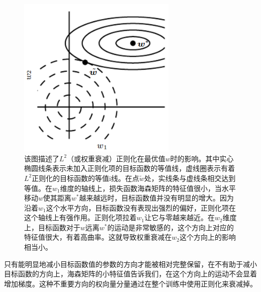 \begin{figure}[htbp] %
   \centering
   \includegraphics[width=3in]{fig/chap7/7_1.png} 
   \caption{该图描述了$L^2$（或权重衰减）正则化在最优值$w$时的影响。其中实心椭圆线条表示未加入正则化项的目标函数的等值线，虚线圈表示有着$L^2$正则化的目标函数的等值i线。在点$\widetilde{w}$处，实线条与虚线条相交达到等值。在$w_1$维度的轴线上，损失函数海森矩阵的特征值很小，当水平移动$w$使其距离$w^*$越来越远时，目标函数值并没有明显的增大。因为沿着$w_1$这个水平方向，目标函数没有表现出强烈的偏好，正则化项在这个轴线上有强作用。正则化项拉着$w_1$让它与零越来越近。在$w_2$维度上，目标函数对于$w$远离$w^*$的运动是非常敏感的，这个方向上对应的特征值很大，有着高曲率。这就导致权重衰减在$w_2$这个方向上的影响相当小。}
   \label{fig:7_1}
\end{figure}

只有能明显地减小目标函数值的参数的方向才能被相对完整保留，在不有助于减小目标函数的方向上，海森矩阵的小特征值告诉我们，在这个方向上的运动不会显着增加梯度。这种不重要方向的权向量分量通过在整个训练中使用正则化来衰减掉。

